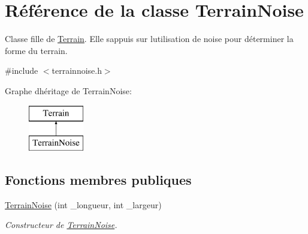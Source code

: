 \hypertarget{class_terrain_noise}{}\section{Référence de la classe Terrain\+Noise}
\label{class_terrain_noise}


Classe fille de \hyperlink{class_terrain}{Terrain}. Elle s\textquotesingle{}appuis sur l\textquotesingle{}utilisation de noise pour déterminer la forme du terrain.  




{\ttfamily \#include $<$terrainnoise.\+h$>$}

Graphe d\textquotesingle{}héritage de Terrain\+Noise\+:\begin{figure}[H]
\begin{center}
\leavevmode
\includegraphics[height=2.000000cm]{class_terrain_noise}
\end{center}
\end{figure}
\subsection*{Fonctions membres publiques}
\begin{DoxyCompactItemize}
\item 
\hyperlink{class_terrain_noise_ade7285caeec8d121790159ad6b0af25f}{Terrain\+Noise} (int \+\_\+longueur, int \+\_\+largeur)
\begin{DoxyCompactList}\small\item\em Constructeur de \hyperlink{class_terrain_noise}{Terrain\+Noise}. \end{DoxyCompactList}\end{DoxyCompactItemize}
